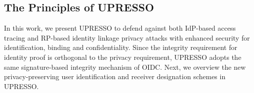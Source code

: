 \begin{comment}
	\item \textbf{No Binding.} IdP, who doesn't know the RP's identifier, fails to bind the identity proof with a specified RP.
On receiving the identity proof not bound to it, the RP either (1) rejects the proof and halts its service; or (2) accepts the proof.
The second case will make  one identity proof  be accepted by multiple RPs, which results in the misuse of identity proof for impersonation attacks and identity injection~\cite{ChenPCTKT14,FettKS16,WangZLG16}.
    \item \textbf{No Confidentiality.}
    The potential leakage of the identity proof exists, as:
    (1) No reliable checks (from the IdP and user) during the generation of identity proof, as the IdP lacks the correct RP identifier to retrieve the exact information from the local storage,
     while the user fails to obtain the correct RP name (or URL) from IdP for the check.
     Therefore, the malicious RP may cheat user about its identity to request the identity proof for another RP without being found by the IdP and user.
     (2) Lack of correct URL for the transmission, as without the correct RP identifier, IdP fails to extract the correct (locally stored) URL.
      The trusted user agent may transmit the identity proof to the incorrect URL hold by the adversary.
    The leakage of identity proof may result in the impersonation attacks~\cite{ChenPCTKT14,FettKS16,WangZLG16}.
\end{itemize}
Due to these conflicts, no existing SSO systems satisfy the two privacy requirements.
IdP-based access tracing exists in the implementations based on SAML, OAuth, and OIDC, as IdP knows identifiers accessed by the user.
RP-based identity linkage is not prevented in BrowserID~\cite{BrowserID} and SPRESSO~\cite{SPRESSO}, as the email address is sent to all the RPs.
\end{comment}





\subsection{The Principles of UPRESSO}
\label{subsec:solutions}
In this work, we present UPRESSO to defend against both IdP-based access tracing and RP-based identity linkage privacy attacks with enhanced security for identification, binding and confidentiality. %
Since the integrity requirement for identity proof is orthogonal to the privacy requirement, UPRESSO adopts the same signature-based integrity mechanism of OIDC.
Next, we overview the new privacy-preserving user identification and receiver designation schemes in UPRESSO.

